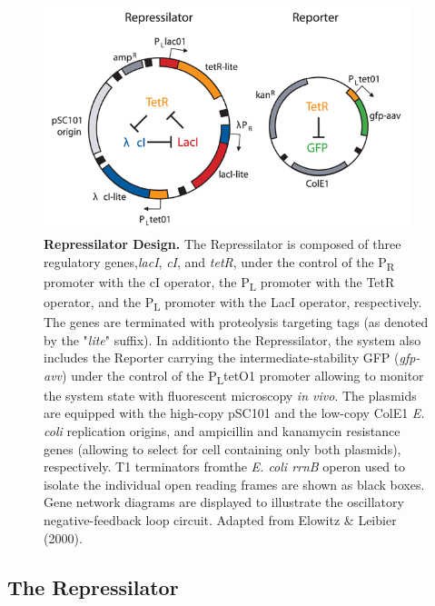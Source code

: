 \documentclass[runningheads,a4paper]{llncs}
\begin{document}
\begin{figure}[H]
    \singlespacing
    \centering
    \includegraphics[width=0.95\textwidth]{fig/Repressilator_plasmid.png}
    \caption{\textbf{Repressilator Design.} The Repressilator is composed of three regulatory genes,\linebreak \textit{lacI}, \textit{cI}, and \textit{tetR}, under the control of the P\textsubscript{R} promoter with the cI operator, the P\textsubscript{L} promoter with the TetR operator, and the P\textsubscript{L} promoter with the LacI operator, respectively. The genes are terminated with proteolysis targeting tags (as denoted by the "\textit{lite}" suffix). In addition\linebreak to the Repressilator, the system also includes the Reporter carrying the intermediate-stability GFP (\textit{gfp-avv}) under the control of the P\textsubscript{L}tetO1 promoter allowing to monitor the system state with fluorescent microscopy \textit{in vivo}. The plasmids are equipped with the high-copy pSC101 and the low-copy ColE1 \textit{E. coli} replication origins, and ampicillin and kanamycin resistance genes (allowing to select for cell containing only both plasmids), respectively. T1 terminators from\linebreak the \textit{E. coli rrnB} operon used to isolate the individual open reading frames are shown as black boxes. Gene network diagrams are displayed to illustrate the oscillatory negative-feedback loop circuit. Adapted from Elowitz \& Leibier (2000)\cite{Elowitz2000d}.}
    \label{fig:fig1}
\end{figure}

\subsection*{The Repressilator}
\end{document}
